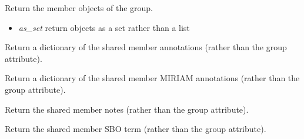 \documentclass[a4paper,11pt,english]{sphinxmanual}
\begin{document}
\begin{fulllineitems}
\begin{fulllineitems}
\label{modules_doc:cbmpy.CBModel.Group.getMembers}
Return the member objects of the group.
\begin{itemize}
\item {} 
\emph{as\_set} return objects as a set rather than a list

\end{itemize}

\end{fulllineitems}


\begin{fulllineitems}
\label{modules_doc:cbmpy.CBModel.Group.getSharedAnnotations}
Return a dictionary of the shared member annotations (rather than the group attribute).

\end{fulllineitems}


\begin{fulllineitems}
\label{modules_doc:cbmpy.CBModel.Group.getSharedMIRIAMannotations}
Return a dictionary of the shared member MIRIAM annotations (rather than the group attribute).

\end{fulllineitems}


\begin{fulllineitems}
\label{modules_doc:cbmpy.CBModel.Group.getSharedNotes}
Return the shared member notes (rather than the group attribute).

\end{fulllineitems}


\begin{fulllineitems}
\label{modules_doc:cbmpy.CBModel.Group.getSharedSBOterm}
Return the shared member SBO term (rather than the group attribute).

\end{fulllineitems}


\end{fulllineitems}
\end{document}
